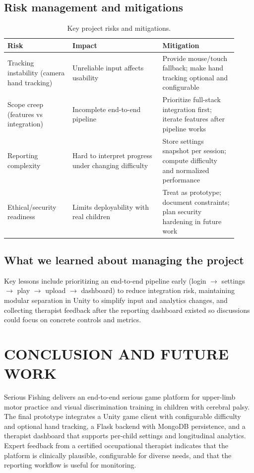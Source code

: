 \documentclass[12pt]{article}
\begin{document}
\subsection*{Risk management and mitigations}
\begin{table}[H]
\centering
\caption{Key project risks and mitigations.}
\label{tab:risks}
\begin{tabular}{p{0.26\linewidth} p{0.36\linewidth} p{0.30\linewidth}}
\toprule
\textbf{Risk} & \textbf{Impact} & \textbf{Mitigation} \\
\midrule
Tracking instability (camera hand tracking) & Unreliable input affects usability & Provide mouse/touch fallback; make hand tracking optional and configurable \\
Scope creep (features vs integration) & Incomplete end-to-end pipeline & Prioritize full-stack integration first; iterate features after pipeline works \\
Reporting complexity & Hard to interpret progress under changing difficulty & Store settings snapshot per session; compute difficulty and normalized performance \\
Ethical/security readiness & Limits deployability with real children & Treat as prototype; document constraints; plan security hardening in future work \\
\bottomrule
\end{tabular}
\end{table}

\subsection*{What we learned about managing the project}
Key lessons include prioritizing an end-to-end pipeline early (login $\rightarrow$ settings $\rightarrow$ play $\rightarrow$ upload $\rightarrow$ dashboard) to reduce integration risk, maintaining modular separation in Unity to simplify input and analytics changes, and collecting therapist feedback after the reporting dashboard existed so discussions could focus on concrete controls and metrics.

\clearpage
\section{CONCLUSION AND FUTURE WORK}
Serious Fishing delivers an end-to-end serious game platform for upper-limb motor practice and visual discrimination training in children with cerebral palsy. The final prototype integrates a Unity game client with configurable difficulty and optional hand tracking, a Flask backend with MongoDB persistence, and a therapist dashboard that supports per-child settings and longitudinal analytics. Expert feedback from a certified occupational therapist indicates that the platform is clinically plausible, configurable for diverse needs, and that the reporting workflow is useful for monitoring.
\end{document}
